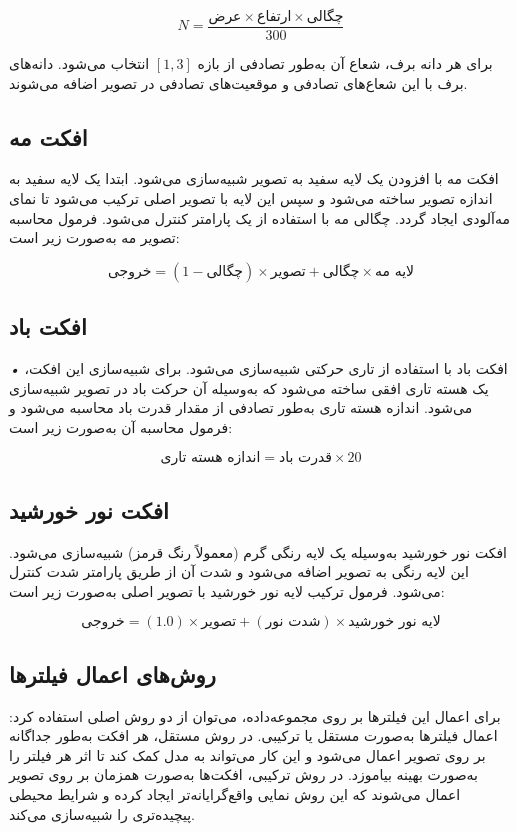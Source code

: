 \[
N = \frac{\text{عرض} \times \text{ارتفاع} \times \text{چگالی}}{300}
\]


برای هر دانه برف، شعاع آن به‌طور تصادفی از بازه \(\left[1, 3\right]\) انتخاب می‌شود. دانه‌های برف با این شعاع‌های تصادفی و موقعیت‌های تصادفی در تصویر اضافه می‌شوند.



\subsection{افکت مه }
افکت مه با افزودن یک لایه سفید به تصویر شبیه‌سازی می‌شود. ابتدا یک لایه سفید به اندازه تصویر ساخته می‌شود و سپس این لایه با تصویر اصلی ترکیب می‌شود تا نمای مه‌آلودی ایجاد گردد. چگالی مه با استفاده از یک پارامتر کنترل می‌شود. فرمول محاسبه تصویر مه به‌صورت زیر است:






\[
\text{خروجی} = (1 - \text{چگالی}) \times \text{تصویر} + \text{چگالی} \times \text{لایه مه}
\]



\subsection{افکت باد }\textit{•}
افکت باد با استفاده از تاری حرکتی  شبیه‌سازی می‌شود. برای شبیه‌سازی این افکت، یک هسته تاری افقی ساخته می‌شود که به‌وسیله آن حرکت باد در تصویر شبیه‌سازی می‌شود. اندازه هسته تاری به‌طور تصادفی از مقدار قدرت باد محاسبه می‌شود و فرمول محاسبه آن به‌صورت زیر است:

\[ \text{اندازه هسته تاری} = \text{قدرت باد} \times 20 \]


\subsection{افکت نور خورشید }
افکت نور خورشید به‌وسیله یک لایه رنگی گرم (معمولاً رنگ قرمز) شبیه‌سازی می‌شود. این لایه رنگی به تصویر اضافه می‌شود و شدت آن از طریق پارامتر شدت کنترل می‌شود. فرمول ترکیب لایه نور خورشید با تصویر اصلی به‌صورت زیر است:

\[ \text{خروجی} = (1.0) \times \text{تصویر} + (\text{شدت نور}) \times \text{لایه نور خورشید} \]


\subsection{روش‌های اعمال فیلترها}
برای اعمال این فیلترها بر روی مجموعه‌داده، می‌توان از دو روش اصلی استفاده کرد: اعمال فیلترها به‌صورت مستقل یا ترکیبی. در روش مستقل، هر افکت به‌طور جداگانه بر روی تصویر اعمال می‌شود و این کار می‌تواند به مدل کمک کند تا اثر هر فیلتر را به‌صورت بهینه بیاموزد. در روش ترکیبی، افکت‌ها به‌صورت همزمان بر روی تصویر اعمال می‌شوند که این روش نمایی واقع‌گرایانه‌تر ایجاد کرده و شرایط محیطی پیچیده‌تری را شبیه‌سازی می‌کند.


